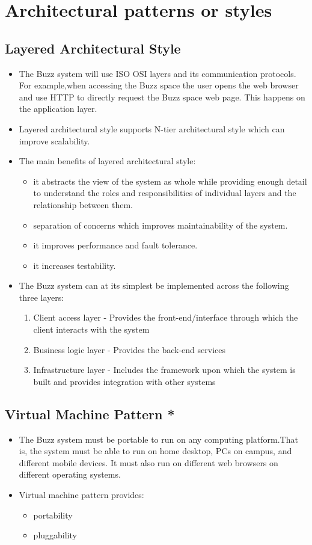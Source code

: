 \documentclass[12pt, oneside]{article}
\begin{document}
\section{Architectural patterns or styles}
	\subsection{Layered Architectural Style}
	\begin{itemize}
		\item The Buzz system will use ISO OSI layers and its communication protocols. For example,when accessing the Buzz space the user opens the web browser and use HTTP to directly request the Buzz space web page. This happens on the application layer.
		\item Layered architectural style supports N-tier architectural style which can improve scalability.
		\item The main benefits of layered architectural style:
			\begin{itemize}
			\item it abstracts the view of the system as whole while providing enough detail to understand the roles and responsibilities of individual layers and the relationship between them.
			\item separation of concerns which improves maintainability of the system.
			\item it improves performance and fault tolerance.
			\item it increases testability.
			\end{itemize}
		\item The Buzz system can at its simplest be implemented across the following three layers:
		\begin{enumerate}
		\item Client access layer - Provides the front-end/interface through which the client interacts with the system
		\item Business logic layer - Provides the back-end services
		\item Infrastructure layer - Includes the framework upon which the system is built and provides integration with other systems
		\end{enumerate}
	\end{itemize}
	\subsection{Virtual Machine Pattern *}
	\begin{itemize}
		\item The Buzz system must be portable to run on any computing platform.That is, the system must be able to run on home desktop, PCs on campus, and different mobile devices. It must also run on different web browsers on different operating systems.
		\item Virtual machine pattern provides:
		\begin{itemize}
			\item portability
			\item pluggability
		\end{itemize}
	\end{itemize}
\end{document}
